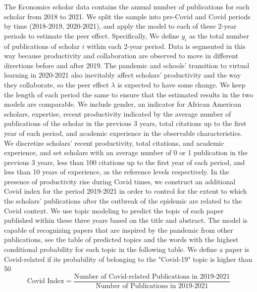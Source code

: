 The Economics scholar data contains the annual number of publications for each scholar from 2018 to 2021. We split the sample into pre-Covid and Covid periods by time (2018-2019, 2020-2021), and apply the model to each of these 2-year periods to estimate the peer effect. Specifically, We define $y_i$ as the total number of publications of scholar $i$ within each 2-year period. Data is segmented in this way because productivity and collaboration are observed to move in different directions before and after 2019. The pandemic and schools' transition to virtual learning in 2020-2021 also inevitably affect scholars' productivity and the way they collaborate, so the peer effect $\lambda$ is expected to have some change. We keep the length of each period the same to ensure that the estimated results in the two models are comparable. We include gender, an indicator for African American scholars, expertise, recent productivity indicated by the average number of publications of the scholar in the previous 3 years, total citations up to the first year of each period, and academic experience in the observable characteristics. We discretize scholars' recent productivity, total citations, and academic experience, and set scholars with an average number of 0 or 1 publication in the previous 3 years, less than 100 citations up to the first year of each period, and less than 10 years of experience, as the reference levels respectively. In the presence of productivity rise during Covid times, we construct an additional Covid index for the period 2019-2021 in order to control for the extent to which the scholars' publications after the outbreak of the epidemic are related to the Covid context. We use topic modeling to predict the topic of each paper published within these three years based on the title and abstract. The model is capable of recognizing papers that are inspired by the pandemic from other publications, see the table of predicted topics and the words with the highest conditional probability for each topic in the following table. We define a paper is Covid-related
if its probability of belonging to the "Covid-19" topic is higher than 50\
\begin{equation}
    \nonumber
    \text{Covid Index} = \frac{\text{Number of Covid-related Publications in 2019-2021}}{\text{Number of Publications in 2019-2021}}
\end{equation}

